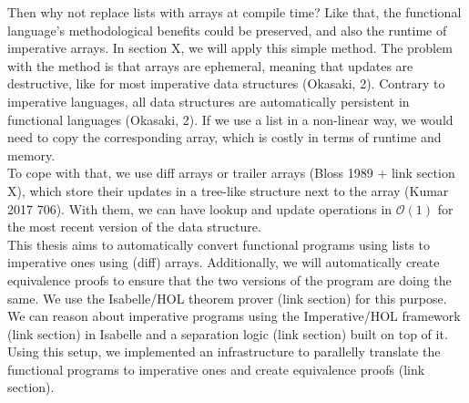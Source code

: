 \noindent Then why not replace lists with arrays at compile time? Like that, the functional language's methodological benefits could be preserved, and also the runtime of imperative arrays. In section X, we will apply this simple method. The problem with the method is that arrays are ephemeral, meaning that updates are destructive, like for most imperative data structures (Okasaki, 2). Contrary to imperative languages, all data structures are automatically persistent in functional languages (Okasaki, 2).
If we use a list in a non-linear way, we would need to copy the corresponding array, which is costly in terms of runtime and memory. \\
To cope with that, we use diff arrays or trailer arrays (Bloss 1989 + link section X), which store their updates in a tree-like structure next to the array (Kumar 2017 706). 
With them, we can have lookup and update operations in $\mathcal{O}(1)$ for the most recent version of the data structure. \\
This thesis aims to automatically convert functional programs using lists to imperative ones using (diff) arrays. Additionally, we will automatically create equivalence proofs to ensure that the two versions of the program are doing the same. We use the Isabelle/HOL theorem prover (link section) for this purpose. We can reason about imperative programs using the Imperative/HOL framework (link section) in Isabelle and a separation logic (link section) built on top of it. Using this setup, we implemented an infrastructure to parallelly translate the functional programs to imperative ones and create equivalence proofs (link section).

